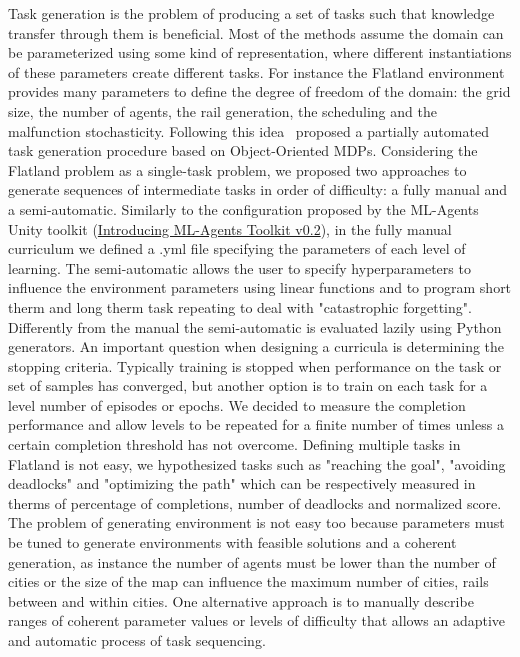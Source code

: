 \documentclass[11pt, a4paper, hidelinks]{report}
\begin{document}
Task generation is the problem of producing a set of tasks such that knowledge transfer through them is beneficial.
Most of the methods assume the domain can be parameterized using some kind of representation, where different instantiations of these parameters create different tasks.
For instance the Flatland environment provides many parameters to define the degree of freedom of the domain: the grid size, the number of agents, the rail generation, the scheduling and the malfunction stochasticity.
Following this idea~\citep{object-oriented-mdp} proposed a partially automated task generation procedure based on Object-Oriented MDPs.
Considering the Flatland problem as a single-task problem, we proposed two approaches to generate sequences of intermediate tasks in order of difficulty: a fully manual and a semi-automatic.
Similarly to the configuration proposed by the ML-Agents Unity toolkit (\href{https://blogs.unity3d.com/2017/12/08/introducing-ml-agents-v0-2-curriculum-learning-new-environments-and-more}{Introducing ML-Agents Toolkit v0.2}), in the fully manual curriculum we defined a .yml file specifying the parameters of each level of learning.
The semi-automatic allows the user to specify hyperparameters to influence the environment parameters using linear functions and to program short therm and long therm task repeating to deal with "catastrophic forgetting".
Differently from the manual the semi-automatic is evaluated lazily using Python generators.
An important question when designing a curricula is determining the stopping criteria.
Typically training is stopped when performance on the task or set of samples has converged, but another option is to train on each task for a level number of episodes or epochs.
We decided to measure the completion performance and allow levels to be repeated for a finite number of times unless a certain completion threshold has not overcome.
Defining multiple tasks in Flatland is not easy, we hypothesized tasks such as "reaching the goal", "avoiding deadlocks" and "optimizing the path" which can be respectively measured in therms of percentage of completions, number of deadlocks and normalized score.
The problem of generating environment is not easy too because parameters must be tuned to generate environments with feasible solutions and a coherent generation, as instance the number of agents must be lower than the number of cities or the size of the map can influence the maximum number of cities, rails between and within cities.
One alternative approach is to manually describe ranges of coherent parameter values or levels of difficulty that allows an adaptive and automatic process of task sequencing.
\end{document}
